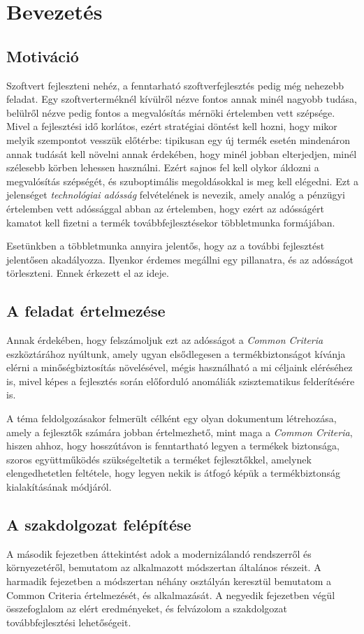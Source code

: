 \chapter{Bevezetés}

\section{Motiváció}

Szoftvert fejleszteni nehéz, a fenntarható szoftverfejlesztés pedig még nehezebb feladat.
Egy szoftverterméknél kívülről nézve fontos annak minél nagyobb tudása, belülről nézve pedig fontos
a megvalósítás mérnöki értelemben vett szépsége.
Mivel a fejlesztési idő korlátos, ezért stratégiai döntést kell hozni, hogy mikor melyik szempontot
vesszük előtérbe: tipikusan egy új termék esetén mindenáron annak tudását kell növelni annak
érdekében, hogy minél jobban elterjedjen, minél szélesebb körben lehessen használni.  Ezért sajnos
fel kell olykor áldozni a megvalósítás szépségét, és szuboptimális megoldásokkal is meg kell
elégedni. Ezt a jelenséget \emph{technológiai adósság}\cite{magnusson2014technology} felvételének is
nevezik, amely analóg a pénzügyi értelemben vett adóssággal abban az értelemben, hogy ezért az
adósságért kamatot kell fizetni a termék továbbfejlesztésekor többletmunka formájában.

Esetünkben a többletmunka annyira jelentős, hogy az a további fejlesztést jelentősen akadályozza.
Ilyenkor érdemes megállni egy pillanatra, és az adósságot törleszteni. Ennek érkezett el az ideje.

\section{A feladat értelmezése}
Annak érdekében, hogy felszámoljuk ezt az adósságot a \emph{Common Criteria} eszköztárához nyúltunk,
amely ugyan elsődlegesen a termékbiztonságot kívánja elérni a minőségbiztosítás növelésével,
mégis használható a mi céljaink eléréséhez is, mivel képes a fejlesztés során előforduló anomáliák
szisztematikus felderítésére is.

A téma feldolgozásakor felmerült célként egy olyan dokumentum létrehozása, amely a fejlesztők
számára jobban értelmezhető, mint maga a \emph{Common Criteria}, hiszen ahhoz, hogy hosszútávon is
fenntartható legyen a termékek biztonsága, szoros együttműködés szükségeltetik a terméket
fejlesztőkkel, amelynek elengedhetetlen feltétele, hogy legyen nekik is átfogó képük
a termékbiztonság kialakításának módjáról.

\section{A szakdolgozat felépítése}
A második fejezetben áttekintést adok a modernizálandó rendszerről és környezetéről, bemutatom az
alkalmazott módszertan általános részeit. A harmadik fejezetben a módszertan néhány osztályán
keresztül bemutatom a Common Criteria értelmezését, és alkalmazását. A negyedik fejezetben végül
összefoglalom az elért eredményeket, és felvázolom a szakdolgozat továbbfejlesztési lehetőségeit.
